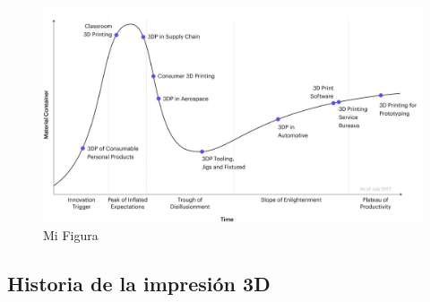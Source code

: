 \begin{figure}[tp]
  \centering
    \includegraphics[width=\textwidth]{images/The3Dprintinghypecycle.png}
  \caption{Mi Figura}
  \label{fig:ejemplo}
\end{figure}



\subsection{Historia de la impresión 3D}

